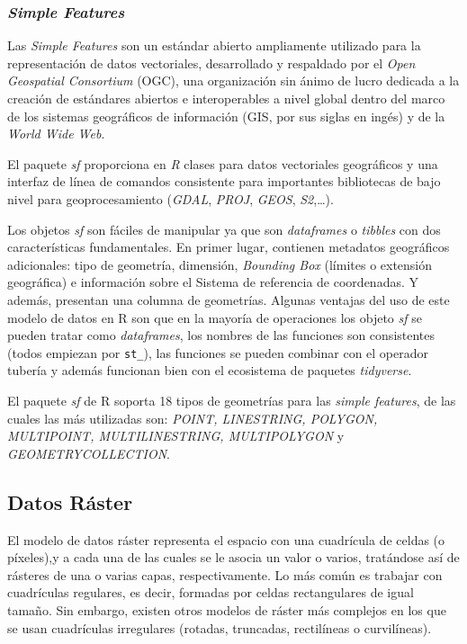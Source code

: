 \documentclass[12pt,a4paper,]{book}
\numberwithin{dummy}{section}
\theoremstyle{ocrenumbox}
\theoremstyle{blacknumex}
\theoremstyle{blacknumbox}
\theoremstyle{ocrenum}
\theoremstyle{ocrenum}
\begin{document}
\hypertarget{simple-features}{%
\subsubsection*{\texorpdfstring{\emph{Simple
Features}}{Simple Features}}\label{simple-features}}

Las \emph{Simple Features} son un estándar abierto ampliamente utilizado
para la representación de datos vectoriales, desarrollado y respaldado
por el \emph{Open Geospatial Consortium} (OGC), una organización sin
ánimo de lucro dedicada a la creación de estándares abiertos e
interoperables a nivel global dentro del marco de los sistemas
geográficos de información (GIS, por sus siglas en ingés) y de la
\emph{World Wide Web}. \citep{OCGweb}

El paquete \emph{sf} proporciona en \emph{R} clases para datos
vectoriales geográficos y una interfaz de línea de comandos consistente
para importantes bibliotecas de bajo nivel para geoprocesamiento
(\emph{GDAL}, \emph{PROJ}, \emph{GEOS}, \emph{S2},\ldots).
\citep{sfpackage}

Los objetos \emph{sf} son fáciles de manipular ya que son
\emph{dataframes} o \emph{tibbles} con dos características
fundamentales. En primer lugar, contienen metadatos geográficos
adicionales: tipo de geometría, dimensión, \emph{Bounding Box} (límites
o extensión geográfica) e información sobre el Sistema de referencia de
coordenadas. Y además, presentan una columna de geometrías. Algunas
ventajas del uso de este modelo de datos en R son que en la mayoría de
operaciones los objeto \emph{sf} se pueden tratar como
\emph{dataframes}, los nombres de las funciones son consistentes (todos
empiezan por \texttt{st\_}), las funciones se pueden combinar con el
operador tubería y además funcionan bien con el ecosistema de paquetes
\emph{tidyverse}.

El paquete \emph{sf} de R soporta 18 tipos de geometrías para las
\emph{simple features}, de las cuales las más utilizadas son:
\emph{POINT, LINESTRING, POLYGON, MULTIPOINT, MULTILINESTRING,
MULTIPOLYGON} y \emph{GEOMETRYCOLLECTION}.

\hypertarget{datos-ruxe1ster}{%
\subsection{Datos Ráster}\label{datos-ruxe1ster}}

El modelo de datos ráster representa el espacio con una cuadrícula de
celdas (o píxeles),y a cada una de las cuales se le asocia un valor o
varios, tratándose así de rásteres de una o varias capas,
respectivamente. Lo más común es trabajar con cuadrículas regulares, es
decir, formadas por celdas rectangulares de igual tamaño. Sin embargo,
existen otros modelos de ráster más complejos en los que se usan
cuadrículas irregulares (rotadas, truncadas, rectilíneas o curvilíneas).
\citep{lovelace_geocomputation_2019}
\end{document}
